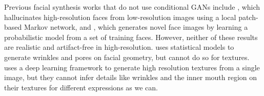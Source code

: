 Previous facial synthesis works that do not use conditional GANs include  \cite{liu2007face}, which hallucinates high-resolution faces from low-resolution images using a local patch-based Markov network, and
\cite{mohammed2009visio}, which generates novel face images by learning a probabilistic model from a set of training faces. 
However, neither of these results are realistic and artifact-free in high-resolution. \cite{golovinskiy2006statistical} uses statistical models to generate wrinkles and pores on facial geometry, but cannot do so for textures. \cite{saito2016} uses a deep learning framework to generate high resolution textures from a single image, but they cannot infer details like wrinkles and the inner mouth region on their textures for different expressions as we can.
